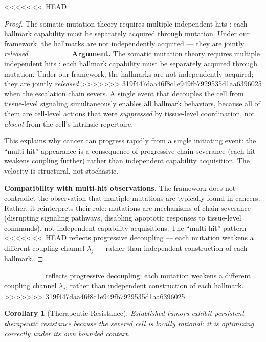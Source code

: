 \documentclass[11pt]{article}
\newtheorem{corollary}[theorem]{Corollary}
\theoremstyle{definition}
\theoremstyle{remark}
\begin{document}
<<<<<<< HEAD
\begin{proof}
The somatic mutation theory requires multiple independent hits
\cite{Vogelstein2013}: each hallmark capability must be separately
acquired through mutation. Under our framework, the hallmarks are
not independently acquired --- they are jointly \emph{released}
=======
\textbf{Argument.}
The somatic mutation theory requires multiple independent hits
\cite{Vogelstein2013}: each hallmark capability must be separately
acquired through mutation. Under our framework, the hallmarks are
not independently acquired; they are jointly \emph{released}
>>>>>>> 319f447daa46f8c1e949fb7929535d1aa6396025
when the escalation chain severs. A single event that decouples the
cell from tissue-level signaling simultaneously enables all
hallmark behaviors, because all of them are cell-level actions that
were \emph{suppressed} by tissue-level coordination, not
\emph{absent} from the cell's intrinsic repertoire.

This explains why cancer can progress rapidly from a single
initiating event: the ``multi-hit'' appearance is a consequence of
progressive chain severance (each hit weakens coupling further)
rather than independent capability acquisition. The velocity is
structural, not stochastic.

\textbf{Compatibility with multi-hit observations.} The framework
does not contradict the observation that multiple mutations are
typically found in cancers. Rather, it reinterprets their role:
mutations are mechanisms of chain severance (disrupting signaling
pathways, disabling apoptotic responses to tissue-level commands),
not independent capability acquisitions. The ``multi-hit'' pattern
<<<<<<< HEAD
reflects progressive decoupling --- each mutation weakens a different
coupling channel $\lambda_j$ --- rather than independent construction
of each hallmark.
\end{proof}
=======
reflects progressive decoupling: each mutation weakens a different
coupling channel $\lambda_j$, rather than independent construction
of each hallmark.
\medskip
>>>>>>> 319f447daa46f8c1e949fb7929535d1aa6396025

\begin{corollary}[Therapeutic Resistance]
\label{cor:resistance}
Established tumors exhibit persistent therapeutic resistance because
the severed cell is \emph{locally rational}: it is optimizing
correctly under its own bounded context.
\end{corollary}
\end{document}
